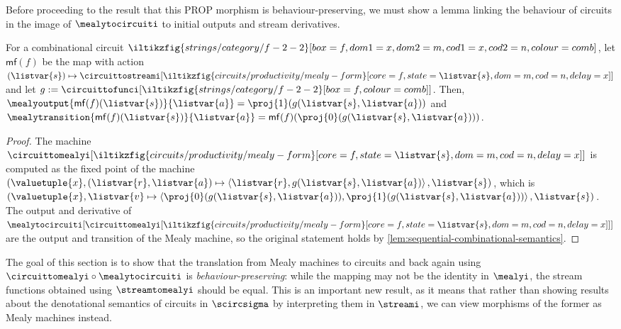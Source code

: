 Before proceeding to the result that this PROP morphism is behaviour-preserving,
we must show a lemma linking the behaviour of circuits in the image of
\(\mealytocircuiti\) to initial outputs and stream derivatives.

\begin{proposition}
    \label{prop:mealy-form-image}
    For a combinational circuit \(
    \iltikzfig{strings/category/f-2-2}[box=f,dom1=x,dom2=m,cod1=x,cod2=n,colour=comb]
    \), let \(\mathsf{mf}(f)\) be the map with action \(
    (\listvar{s}) \mapsto
    \circuittostreami[
        \iltikzfig{circuits/productivity/mealy-form}[core=f,state=\listvar{s},dom=m,cod=n,delay=x]
    ]
    \) and let \(
    g
    :=
    \circuittofunci[
        \iltikzfig{strings/category/f-2-2}[box=f,colour=comb]
    ]
    \).
    Then, \(
    \mealyoutput{\mathsf{mf}(f)(\listvar{s})}{\listvar{a}}
    =
    \proj{1}(g(\listvar{s}, \listvar{a}))
    \) and \(
    \mealytransition{\mathsf{mf}(f)(\listvar{s})}{\listvar{a}}
    =
    \mathsf{mf}(f)(\proj{0}(g(\listvar{s}, \listvar{a})))
    \).
\end{proposition}
\begin{proof}
    The machine \(\circuittomealyi[
        \iltikzfig{circuits/productivity/mealy-form}[core=f,state=\listvar{s},dom=m,cod=n,delay=x]
    ]\) is computed as the fixed point of the machine \(
    \left(\valuetuple{x},
    (\listvar{r}, \listvar{a}) \mapsto \left\langle
    \listvar{r}, g(\listvar{s}, \listvar{a})
    \right\rangle, \listvar{s}\right)
    \), which is \(
    \left(\valuetuple{x},
    \listvar{v} \mapsto \left\langle
    \proj{0}\mleft(g(\listvar{s},\listvar{a})\mright),
    \proj{1}\mleft(g(\listvar{s}, \listvar{a})\mright)
    \right\rangle, \listvar{s}\right)
    \).
    The output and derivative of \(
    \mealytocircuiti[
        \circuittomealyi[
            \iltikzfig{circuits/productivity/mealy-form}[core=f,state=\listvar{s},dom=m,cod=n,delay=x]
        ]
    ]
    \) are the output and transition of the Mealy machine, so the original
    statement holds by \cref{lem:sequential-combinational-semantics}.
\end{proof}

The goal of this section is to show that the translation from Mealy machines to
circuits and back again using \(\circuittomealyi \circ \mealytocircuiti\) is
\emph{behaviour-preserving}: while the mapping may not be the identity in
\(\mealyi\), the stream functions obtained using \(\streamtomealyi\) should
be equal.
This is an important new result, as it means that rather than showing
results about the denotational semantics of circuits in \(\scircsigma\) by
interpreting them in \(\streami\), we can view morphisms of the former as
Mealy machines instead.

